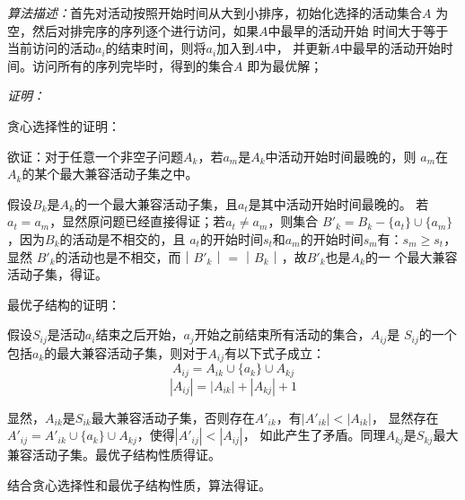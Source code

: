 \begin{solution}
    \textit{算法描述：}首先对活动按照开始时间从大到小排序，初始化选择的活动集合$A$
    为空，然后对排完序的序列逐个进行访问，如果$A$中最早的活动开始
    时间大于等于当前访问的活动$a_i$的结束时间，则将$a_i$加入到$A$中，
    并更新$A$中最早的活动开始时间。访问所有的序列完毕时，得到的集合$A$
    即为最优解；

    \textit{证明：}

    贪心选择性的证明：

    欲证：对于任意一个非空子问题$A_k$，若$a_m$是$A_k$中活动开始时间最晚的，则
    $a_m$在$A_k$的某个最大兼容活动子集之中。

    假设$B_k$是$A_k$的一个最大兼容活动子集，且$a_t$是其中活动开始时间最晚的。
    若$a_t=a_m$，显然原问题已经直接得证；若$a_t \neq a_m$，则集合
    $B'_k = B_k - \{a_t\} \cup \{a_m\}$，因为$B_k$的活动是不相交的，且
    $a_t$的开始时间$s_t$和$a_m$的开始时间$s_m$有：$s_m \ge s_t$，显然
    $B'_k$的活动也是不相交，而$｜B'_k｜ = ｜B_k｜$，故$B'_k$也是$A_k$的一
    个最大兼容活动子集，得证。

    最优子结构的证明：

    假设$S_{ij}$是活动$a_i$结束之后开始，$a_j$开始之前结束所有活动的集合，$A_{ij}$是
    $S_{ij}$的一个包括$a_k$的最大兼容活动子集，则对于$A_{ij}$有以下式子成立：
    $$A_{ij} = A_{ik} \cup \{a_k\} \cup A_{kj}$$
    $$|A_{ij}| = |A_{ik}| + |A_{kj}| + 1$$

    显然，$A_{ik}$是$S_{ik}$最大兼容活动子集，否则存在$A'_{ik}$，有$|A'_{ik}|<|A_{ik}|$，
    显然存在$A'_{ij} = A'_{ik} \cup \{a_k\} \cup A_{kj}$，使得$|A'_{ij}|<|A_{ij}|$，
    如此产生了矛盾。同理$A_{kj}$是$S_{kj}$最大兼容活动子集。最优子结构性质得证。

    结合贪心选择性和最优子结构性质，算法得证。
\end{solution}